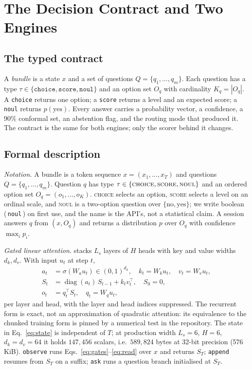 \section{The Decision Contract and Two Engines}
\label{sec:contract}

\subsection{The typed contract}
A \emph{bundle} is a state $x$ and a set of questions $Q=\{q_1,\dots,q_m\}$. Each question has a
type $\tau\in\{\texttt{choice},\texttt{score},\texttt{noul}\}$ and an option set $O_q$ with
cardinality $K_q=|O_q|$. A \texttt{choice} returns one option; a \texttt{score} returns a level
and an expected score; a \texttt{noul} returns $p(\text{yes})$. Every answer carries a probability
vector, a confidence, a 90\% conformal set, an abstention flag, and the routing mode that produced
it. The contract is the same for both engines; only the scorer behind it changes.

\subsection{Formal description}
\label{sec:formal}

\emph{Notation.} A bundle is a token sequence $x=(x_1,\dots,x_T)$ and questions
$Q=\{q_1,\dots,q_m\}$. Question $q$ has type $\tau\in\{\textsc{choice},\textsc{score},
\textsc{noul}\}$ and an ordered option set $O_q=(o_1,\dots,o_K)$. \textsc{choice} selects an
option, \textsc{score} selects a level on an ordinal scale, and \textsc{noul} is a two-option
question over $\{\text{no},\text{yes}\}$; we write boolean (\,\texttt{noul}\,) on first use, and the
name is the API's, not a statistical claim. A session answers $q$ from $(x,O_q)$ and returns a
distribution $p$ over $O_q$ with confidence $\max_i p_i$.

\emph{Gated linear attention.} \stream{} stacks $L_s$ layers of $H$ heads with key and value
widths $d_k,d_v$. With input $u_t$ at step $t$,
\begin{align}
a_t &= \sigma(W_a u_t)\in(0,1)^{d_k},\quad k_t=W_k u_t,\quad v_t=W_v u_t, \label{eq:gates}\\
S_t &= \operatorname{diag}(a_t)\,S_{t-1} + k_t v_t^{\top},\quad S_0=0, \label{eq:state}\\
o_t &= q_t^{\top} S_t,\quad q_t=W_q u_t, \label{eq:read}
\end{align}
per layer and head, with the layer and head indices suppressed. The recurrent form is exact, not an
approximation of quadratic attention: its equivalence to the chunked training form is pinned by a
numerical test in the repository. The state in Eq.~\eqref{eq:state} is independent of $T$; at
production width $L_s=6$, $H=6$, $d_k=d_v=64$ it holds $147{,}456$ scalars, i.e.\ $589{,}824$ bytes
at 32-bit precision (576\,KiB). \texttt{observe} runs Eqs.~\eqref{eq:gates}--\eqref{eq:read} over
$x$ and returns $S_T$; \texttt{append} resumes from $S_T$ on a suffix; \texttt{ask} runs a question
branch initialised at $S_T$.

